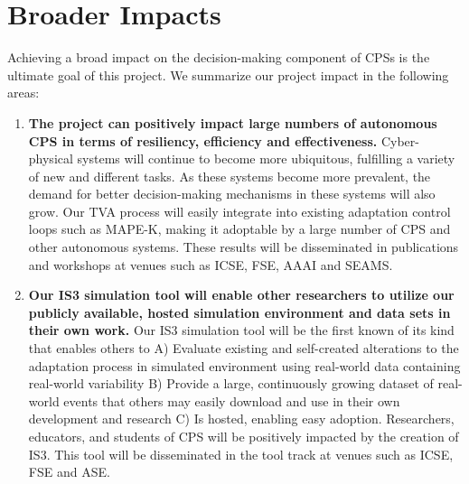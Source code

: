 \documentclass[11pt]{proposalnsf}
\newlength\q %
\begin{document}
\begin{sloppypar}













\section{Broader Impacts}




Achieving a broad impact on the decision-making component of CPSs is the ultimate goal of this project. We summarize our project impact in the following areas:

\begin{enumerate}[noitemsep]
\item \textbf{The project can positively impact large numbers of autonomous CPS in terms of resiliency, efficiency and effectiveness.} Cyber-physical systems will continue to become more ubiquitous, fulfilling a variety of new and different tasks. As these systems become more prevalent, the demand for better decision-making mechanisms in these systems will also grow. Our TVA process will easily integrate into existing adaptation control loops such as MAPE-K, making it adoptable by a large number of CPS and other autonomous systems. These results will be disseminated in publications and workshops at venues such as ICSE, FSE, AAAI and SEAMS.

\item \textbf{Our IS3 simulation tool will enable other researchers to utilize our publicly available, hosted simulation environment and data sets in their own work.} Our IS3 simulation tool will be the first known of its kind that enables others to A) Evaluate existing and self-created alterations to the adaptation process in simulated environment using real-world data containing real-world variability B) Provide a large, continuously growing dataset of real-world events that others may easily download and use in their own development and research C) Is hosted, enabling easy adoption. Researchers, educators, and students of CPS will be positively impacted by the creation of IS3. This tool will be disseminated in the tool track at venues such as ICSE, FSE and ASE.


\end{enumerate}
\end{sloppypar}
\end{document}
